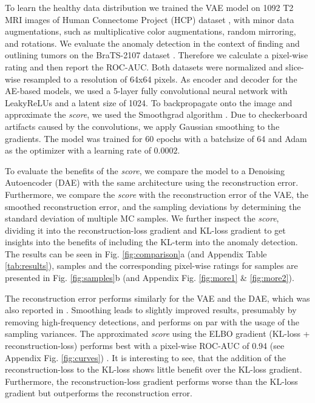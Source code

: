 \documentclass{article}
\begin{document}
To learn the healthy data distribution we trained the VAE model on 1092 T2 MRI images of Human Connectome Project (HCP) dataset \cite{van_essen_human_2012}, with minor data augmentations, such as multiplicative color augmentations, random mirroring, and rotations.
We evaluate the anomaly detection in the context of finding and outlining tumors on the BraTS-2107 dataset \cite{bakas_advancing_2017,menze_multimodal_2015}.
Therefore we calculate a pixel-wise rating and then report the ROC-AUC. 
Both datasets were normalized and slice-wise resampled to a resolution of 64x64 pixels. 
As encoder and decoder for the AE-based models, we used a 5-layer fully convolutional neural network with LeakyReLUs and a latent size of 1024. 
To backpropagate onto the image and approximate the \textit{score}, we used the Smoothgrad algorithm \cite{smilkov_smoothgrad_2017}. Due to checkerboard artifacts caused by the convolutions, we apply Gaussian smoothing to the gradients. 
The model was trained for 60 epochs with a batchsize of 64 and Adam as the optimizer with a learning rate of $0.0002$.



 
To evaluate the benefits of the \textit{score}, we compare the model to a Denoising Autoencoder (DAE) \cite{vincent_stacked_2010} with the same architecture using the reconstruction error.
Furthermore, we compare the \textit{score} with the reconstruction error of the VAE, the smoothed reconstruction error, and the sampling deviations by determining the standard deviation of multiple MC samples.
We further inspect the \textit{score}, dividing it into the reconstruction-loss gradient and KL-loss gradient to get insights into the benefits of including the KL-term into the anomaly detection.
The results can be seen in Fig. \ref{fig:comparison}a (and Appendix Table \ref{tab:results}), samples and the corresponding pixel-wise ratings for samples are presented in Fig. \ref{fig:samples}b (and Appendix Fig. \ref{fig:more1} \& \ref{fig:more2}).
 
The reconstruction error performs similarly for the VAE and the DAE, which was also reported in \cite{chen_deep_2018,pawlowski_unsupervised_2018}. Smoothing leads to slightly improved results, presumably by removing high-frequency detections, and performs on par with the usage of the sampling variances.
The approximated \textit{score} using the ELBO gradient (KL-loss + reconstruction-loss) performs best with a pixel-wise ROC-AUC of 0.94 (see Appendix Fig. \ref{fig:curves}) .
It is interesting to see, that the addition of the reconstruction-loss to the KL-loss shows little benefit over the KL-loss gradient. Furthermore, the reconstruction-loss gradient performs worse than the KL-loss gradient but outperforms the reconstruction error.
\end{document}

